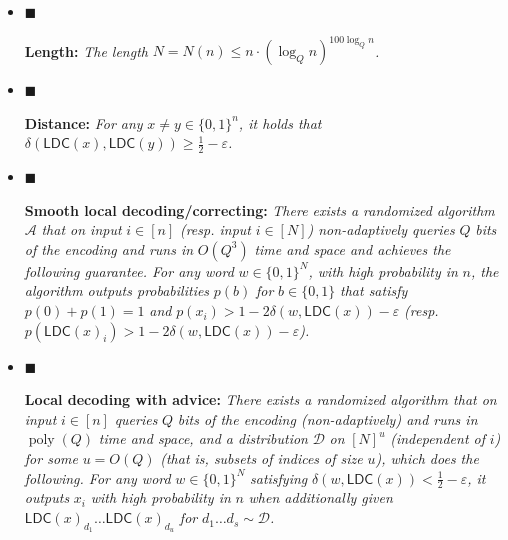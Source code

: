 \documentclass[10pt,a4paper]{article}
\begin{document}
\begin{itemize}


\item[] 
$\blacksquare$ 


\textbf{Length:}\emph{
The length }$N=N(n)\leq n\cdot(\log_{Q}n)^{100\log_{Q}n}$\emph{.}\par





\item[] 
$\blacksquare$ 


\textbf{Distance:}\emph{
For any }$x\not=y\in\{0,1\}^{n}$\emph{, it holds that }$\delta(\mathsf{LDC}(x),\mathsf{LDC}(y))\geq\frac{1}{2}-\varepsilon$\emph{.}\par





\item[] 
$\blacksquare$ 


\textbf{Smooth local decoding/correcting:}\emph{
There exists a randomized algorithm }$\mathcal{A}$\emph{ that on input }$i\in[n]$\emph{ (resp. input }$i\in[N]$\emph{) non-adaptively queries }$Q$\emph{ bits of the encoding and runs in }$O(Q^{3})$\emph{ time and space and achieves the following guarantee. For any word }$w\in\{0,1\}^{N}$\emph{, with high probability in }$n$\emph{, the algorithm outputs probabilities }$p(b)$\emph{ for }$b\in\{0,1\}$\emph{ that satisfy }$p(0)+p(1)=1$\emph{ and }$p(x_{i})>1-2\delta(w,\mathsf{LDC}(x))-\varepsilon$\emph{ (resp. }$p(\mathsf{LDC}(x)_{i})>1-2\delta(w,\mathsf{LDC}(x))-\varepsilon$\emph{).}\par





\item[] 
$\blacksquare$ 


\textbf{Local decoding with advice:}\emph{
There exists a randomized algorithm that on input }$i\in[n]$\emph{ queries }$Q$\emph{ bits of the encoding (non-adaptively) and runs in }$\operatorname{poly}(Q)$\emph{ time and space, and a distribution }$\mathcal{D}$\emph{ on }$[N]^{u}$\emph{ (independent of }$i$\emph{) for some }$u=O(Q)$\emph{ (that is, subsets of indices of size }$u$\emph{), which does the following. For any word }$w\in\{0,1\}^{N}$\emph{ satisfying }$\delta(w,\mathsf{LDC}(x))<\frac{1}{2}-\varepsilon$\emph{, it outputs }$x_{i}$\emph{ with high probability in }$n$\emph{ when additionally given }$\mathsf{LDC}(x)_{d_{1}}\ldots\mathsf{LDC}(x)_{d_{u}}$\emph{ for }$d_{1}\ldots d_{s}\sim\mathcal{D}$\emph{.}\par





\end{itemize}
\end{document}

